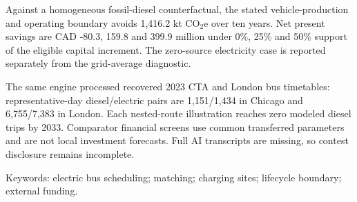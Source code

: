 Against a homogeneous fossil-diesel counterfactual, the stated vehicle-production and operating boundary avoids 1,416.2 kt CO$_2$e over ten years. Net present savings are CAD -80.3, 159.8 and 399.9 million under 0\%, 25\% and 50\% support of the eligible capital increment. The zero-source electricity case is reported separately from the grid-average diagnostic.


The same engine processed recovered 2023 CTA and London bus timetables: representative-day diesel/electric pairs are 1,151/1,434 in Chicago and 6,755/7,383 in London. Each nested-route illustration reaches zero modeled diesel trips by 2033. Comparator financial screens use common transferred parameters and are not local investment forecasts. Full AI transcripts are missing, so contest disclosure remains incomplete.


Keywords: electric bus scheduling; matching; charging sites; lifecycle boundary; external funding.

